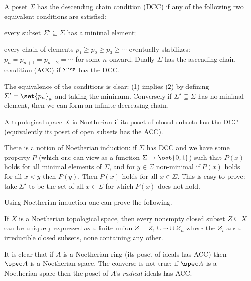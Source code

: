 \bdefn

    A poset $\Sigma$ has the {\emphcolor descending chain condition} ({\emphcolor DCC}) if any of the following two equivalent conditions are satisfied:
    \benum
        \item every subset $\Sigma'\subseteq\Sigma$ has a minimal element;
        \item every chain of elements $p_1\geq p_2\geq p_3\geq\cdots$ eventually stabilizes: $p_n=p_{n+1}=p_{n+2}=\cdots$ for some $n$ onward.
    \eenum
    Dually $\Sigma$ has the {\emphcolor ascending chain condition} ({\emphcolor ACC}) if $\Sigma^\op$ has the DCC.

\edefn

The equivalence of the conditions is clear: (1) implies (2) by defining $\Sigma'=\set{p_n}_n$ and taking the minimum.
Conversely if $\Sigma'\subseteq\Sigma$ has no minimal element, then we can form an infinite decreasing chain.

\bdefn

    A topological space $X$ is {\emphcolor Noetherian} if its poset of closed subsets has the DCC (equivalently its poset of open subsets has the ACC).

\edefn

There is a notion of {\emphcolor Noetherian induction}: if $\Sigma$ has DCC and we have some property $P$ (which one can view as a function $\Sigma\to\set{0,1}$)
such that $P(x)$ holds for all minimal elements of $\Sigma$, and for $y\in\Sigma$ non-minimal if $P(x)$ holds for all $x<y$ then $P(y)$.
Then $P(x)$ holds for all $x\in\Sigma$.
This is easy to prove: take $\Sigma'$ to be the set of all $x\in\Sigma$ for which $P(x)$ does not hold.

Using Noetherian induction one can prove the following.

\bprop[name={noetherianclosedirred}]

    If $X$ is a Noetherian topological space, then every nonempty closed subset $Z\subseteq X$ can be uniquely expressed as a finite union $Z=Z_1\cup\cdots\cup Z_n$
    where the $Z_i$ are all irreducible closed subsets, none containing any other.

\eprop

\bremark

    It is clear that if $A$ is a Noetherian ring (its poset of ideals has ACC) then $\spec A$ is a Noetherian space.
    The converse is not true: if $\spec A$ is a Noetherian space then the poset of $A$'s {\it radical\/} ideals has ACC.

\eremark

